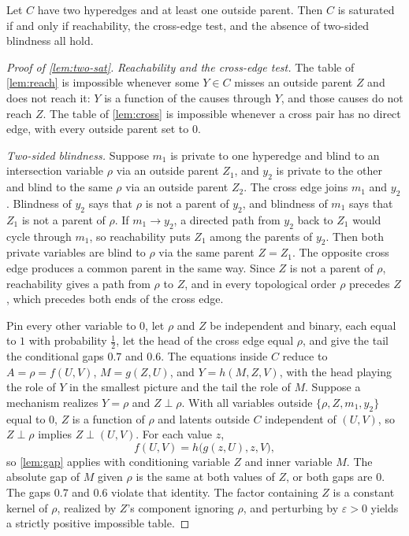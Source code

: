 \begin{lemma}
\label{lem:two-sat}
Let $C$ have two hyperedges and at least one outside parent. Then $C$ is saturated if and only if reachability, the cross-edge test, and the absence of two-sided blindness all hold.
\end{lemma}

\begin{proof}[Proof of \cref{lem:two-sat}]
\emph{Reachability and the cross-edge test.} The table of \cref{lem:reach} is impossible whenever some $Y\in C$ misses an outside parent $Z$ and does not reach it: $Y$ is a function of the causes through $Y$, and those causes do not reach $Z$. The table of \cref{lem:cross} is impossible whenever a cross pair has no direct edge, with every outside parent set to $0$.

\emph{Two-sided blindness.} Suppose $m_1$ is private to one hyperedge and blind to an intersection variable $\rho$ via an outside parent $Z_1$, and $y_2$ is private to the other and blind to the same $\rho$ via an outside parent $Z_2$. The cross edge joins $m_1$ and $y_2$. Blindness of $y_2$ says that $\rho$ is not a parent of $y_2$, and blindness of $m_1$ says that $Z_1$ is not a parent of $\rho$. If $m_1\to y_2$, a directed path from $y_2$ back to $Z_1$ would cycle through $m_1$, so reachability puts $Z_1$ among the parents of $y_2$. Then both private variables are blind to $\rho$ via the same parent $Z=Z_1$. The opposite cross edge produces a common parent in the same way. Since $Z$ is not a parent of $\rho$, reachability gives a path from $\rho$ to $Z$, and in every topological order $\rho$ precedes $Z$, which precedes both ends of the cross edge.

Pin every other variable to $0$, let $\rho$ and $Z$ be independent and binary, each equal to $1$ with probability $\tfrac12$, let the head of the cross edge equal $\rho$, and give the tail the conditional gaps $0.7$ and $0.6$. The equations inside $C$ reduce to $A=\rho=f(U,V)$, $M=g(Z,U)$, and $Y=h(M,Z,V)$, with the head playing the role of $Y$ in the smallest picture and the tail the role of $M$. Suppose a mechanism realizes $Y=\rho$ and $Z\perp\rho$. With all variables outside $\{\rho,Z,m_1,y_2\}$ equal to $0$, $Z$ is a function of $\rho$ and latents outside $C$ independent of $(U,V)$, so $Z\perp\rho$ implies $Z\perp(U,V)$. For each value $z$,
\[
f(U,V)=h\bigl(g(z,U),z,V\bigr),
\]
so \cref{lem:gap} applies with conditioning variable $Z$ and inner variable $M$. The absolute gap of $M$ given $\rho$ is the same at both values of $Z$, or both gaps are $0$. The gaps $0.7$ and $0.6$ violate that identity. The factor containing $Z$ is a constant kernel of $\rho$, realized by $Z$'s component ignoring $\rho$, and perturbing by $\varepsilon>0$ yields a strictly positive impossible table.


\end{proof}

